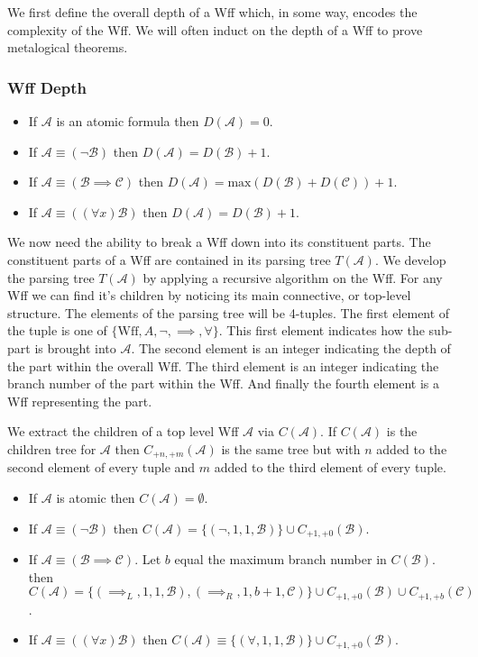 \documentclass[12pt]{article}
\newcommand{\mc}[1]{\mathcal{#1}}
\begin{document}
We first define the overall depth of a Wff which, in some way, encodes the complexity of the Wff.
We will often induct on the depth of a Wff to prove metalogical theorems.

\hrulefill
\subsubsection*{Wff Depth}

\begin{itemize}
\item{If $\mc{A}$ is an atomic formula then $D(\mc{A}) = 0$.}
\item{If $\mc{A} \equiv (\lnot \mc{B})$ then $D(\mc{A}) = D(\mc{B}) + 1$.}
\item{If $\mc{A} \equiv (\mc{B} \implies \mc{C})$ then $D(\mc{A}) = \text{max}(D(\mc{B}) + D(\mc{C})) + 1$.}
\item{If $\mc{A} \equiv ((\forall x) \mc{B})$ then $D(\mc{A}) = D(\mc{B}) + 1$.}
\end{itemize}
\hrulefill

We now need the ability to break a Wff down into its constituent parts.
The constituent parts of a Wff are contained in its parsing tree $T(\mc{A})$.
We develop the parsing tree $T(\mc{A})$ by applying a recursive algorithm on the Wff. 
For any Wff we can find it's children by noticing its main connective, or top-level structure.
The elements of the parsing tree will be 4-tuples.
The first element of the tuple is one of $\{\text{Wff}, A, \lnot, \implies, \forall\}$.
This first element indicates how the sub-part is brought into $\mc{A}$. 
The second element is an integer indicating the depth of the part within the overall Wff.
The third element is an integer indicating the branch number of the part within the Wff.
And finally the fourth element is a Wff representing the part.

We extract the children of a top level Wff $\mc{A}$ via $C(\mc{A})$.
If $C(\mc{A})$ is the children tree for $\mc{A}$ then $C_{+n, +m}(\mc{A})$ is the same tree but with $n$ added to the second element of every tuple and $m$ added to the third element of every tuple.


\hrulefill
\begin{itemize}
\item{If $\mc{A}$ is atomic then $C(\mc{A}) = \emptyset$.}
\item{If $\mc{A} \equiv (\lnot \mc{B})$ then $C(\mc{A}) = \{(\lnot, 1, 1, \mc{B})\} \cup C_{+1, +0}(\mc{B})$.}
\item{If $\mc{A} \equiv (\mc{B} \implies \mc{C})$. Let $b$ equal the maximum branch number in $C(\mc{B})$. then $C(\mc{A}) = \{(\implies_L, 1, 1, \mc{B}), (\implies_R, 1, b+1, \mc{C})\} \cup C_{+1, +0}(\mc{B}) \cup C_{+1, +b}(\mc{C})$.}
\item{If $\mc{A} \equiv ((\forall x)\mc{B})$ then $C(\mc{A}) \equiv \{(\forall, 1, 1, \mc{B})\} \cup C_{+1, +0}(\mc{B})$.}
\end{itemize}
\hrulefill
\end{document}
